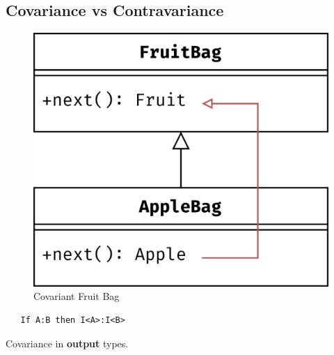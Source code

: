 \subsection{Covariance vs Contravariance}

\begin{paracol}{2}
   \begin{figure}[htbp]
      \centering
      \includegraphics{images/variance1.png}
      \caption{Covariant Fruit Bag}
      \label{fig:variance1}
   \end{figure}
   \begin{lstlisting}
   If A:B then I<A>:I<B>
   \end{lstlisting}

   Covariance in \textbf{output} types.
   
   \switchcolumn


\end{paracol}
